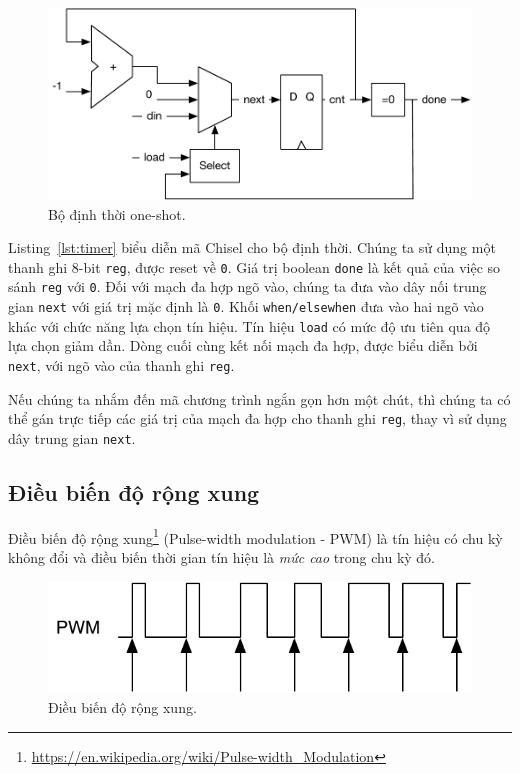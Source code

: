 \documentclass[%
    10pt,
    headinclude, footexclude,
    openright, %
    notitlepage,
    cleardoubleempty,
    headsepline,
    pointlessnumbers,
    bibtotoc, idxtotoc,
    ]{scrbook}
\newcommand{\code}[1]{{\small{\texttt{#1}}}}
\newcommand{\scale}{0.7}
\newcommand{\myref}[2]{\href{#1}{#2}}
\renewcommand{\myref}[2]{{#2}{\footnote{\url{#1}}}}
\begin{document}
\begin{figure}
  \centering
  \includegraphics[scale=\scale]{figures/timer}
  \caption{Bộ định thời one-shot.}
  \label{fig:timer}
\end{figure}

Listing~\ref{lst:timer} biểu diễn mã Chisel cho bộ định thời. Chúng ta sử dụng một thanh ghi 8-bit \code{reg},
được reset về \code{0}. Giá trị boolean \code{done} là kết quả của việc so sánh \code{reg}
với \code{0}. Đối với mạch đa hợp ngõ vào, chúng ta đưa vào dây nối trung gian \code{next} với giá trị 
mặc định là \code{0}. Khối \code{when/elsewhen} đưa vào hai ngõ vào khác với chức năng lựa chọn tín hiệu. 
Tín hiệu \code{load} có mức độ ưu tiên qua độ lựa chọn giảm dần.
Dòng cuối cùng kết nối mạch đa hợp, được biểu diễn bởi \code{next}, với ngõ vào của thanh ghi \code{reg}. 


Nếu chúng ta nhắm đến mã chương trình ngắn gọn hơn một chút, thì chúng ta có thể gán trực tiếp các 
giá trị của mạch đa hợp cho thanh ghi \code{reg}, thay vì sử dụng dây trung gian \code{next}. 

\subsection{Điều biến độ rộng xung}

\myref{https://en.wikipedia.org/wiki/Pulse-width_Modulation}{Điều biến độ rộng xung} (Pulse-width modulation - PWM)
là tín hiệu có chu kỳ không đổi và điều biến thời gian tín hiệu là \emph{mức cao} trong chu kỳ đó.

\begin{figure}
  \centering
  \includegraphics[scale=\scale]{figures/pwm}
  \caption{Điều biến độ rộng xung.}
  \label{fig:pwm}
\end{figure}
\end{document}
